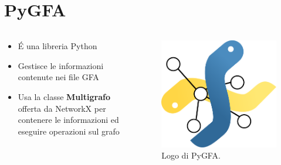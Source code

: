 \documentclass{beamer}
\begin{document}

\section{PyGFA}
\begin{frame}{\secname}

	\begin{columns}
		\begin{column}{0.7\textwidth}
			\begin{itemize}
				\item \'E una libreria Python
				\item Gestisce le informazioni contenute nei file GFA
				\item Usa la classe \textbf{Multigrafo} offerta da NetworkX per
					contenere le informazioni ed eseguire operazioni
					sul grafo
			\end{itemize}
		\end{column}
		
		\begin{column}{0.3\textwidth}
			\begin{figure}
				\includegraphics[scale=0.25]{pygfa}
				\caption{Logo di PyGFA.}
			\end{figure}
		\end{column}
		
	\end{columns}
\end{frame}
\end{document}
